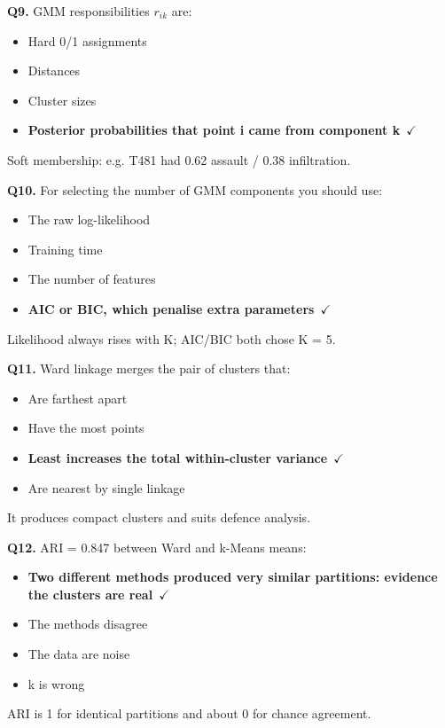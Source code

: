 \documentclass[11pt]{article}
\begin{document}
{\noindent\textbf{Q9.} GMM responsibilities $r_{ik}$ are:\begin{itemize}[leftmargin=2.2em,itemsep=0pt,topsep=1pt]\item[A.] Hard 0/1 assignments\item[B.] Distances\item[C.] Cluster sizes\item[\textbf{D.}] \textbf{Posterior probabilities that point i came from component k}~{\color{GrnN}$\checkmark$}\end{itemize} Soft membership: e.g. T481 had 0.62 assault / 0.38 infiltration.\par\medskip

\noindent\textbf{Q10.} For selecting the number of GMM components you should use:\begin{itemize}[leftmargin=2.2em,itemsep=0pt,topsep=1pt]\item[A.] The raw log-likelihood\item[B.] Training time\item[C.] The number of features\item[\textbf{D.}] \textbf{AIC or BIC, which penalise extra parameters}~{\color{GrnN}$\checkmark$}\end{itemize} Likelihood always rises with K; AIC/BIC both chose K = 5.\par\medskip

\noindent\textbf{Q11.} Ward linkage merges the pair of clusters that:\begin{itemize}[leftmargin=2.2em,itemsep=0pt,topsep=1pt]\item[A.] Are farthest apart\item[B.] Have the most points\item[\textbf{C.}] \textbf{Least increases the total within-cluster variance}~{\color{GrnN}$\checkmark$}\item[D.] Are nearest by single linkage\end{itemize} It produces compact clusters and suits defence analysis.\par\medskip

\noindent\textbf{Q12.} ARI = 0.847 between Ward and k-Means means:\begin{itemize}[leftmargin=2.2em,itemsep=0pt,topsep=1pt]\item[\textbf{A.}] \textbf{Two different methods produced very similar partitions: evidence the clusters are real}~{\color{GrnN}$\checkmark$}\item[B.] The methods disagree\item[C.] The data are noise\item[D.] k is wrong\end{itemize} ARI is 1 for identical partitions and about 0 for chance agreement.\par\medskip

}
\end{document}
